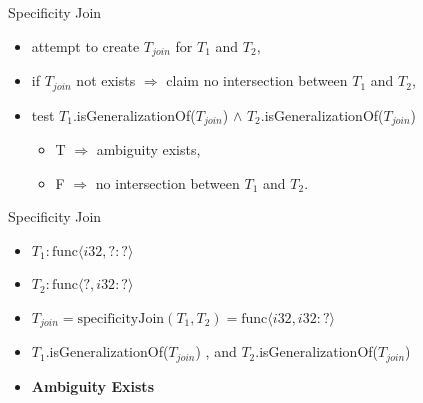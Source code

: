 \documentclass{beamer}
\newcommand{\cmark}{\ding{51}}%
\begin{document}
\begin{frame}{Specificity Join}
\begin{itemize}
    \item attempt to create $T_{join}$ for $T_1$ and $T_2$,
    \item if $T_{join}$ not exists $\Rightarrow$ claim no intersection
          between $T_1$ and $T_2$,
    \item test $T_1$.isGeneralizationOf($T_{join}$) $\land$ 
               $T_2$.isGeneralizationOf($T_{join}$) 
          \begin{itemize}
          \item T $\Rightarrow$ ambiguity exists,
          \item F $\Rightarrow$ no intersection between $T_1$ and $T_2$.
          \end{itemize}
\end{itemize}
\end{frame}

\begin{frame}{Specificity Join}
\begin{itemize}
    \item $T_1 : \text{func}\langle i32, ? : ? \rangle$
    \item $T_2 : \text{func}\langle ?, i32 : ? \rangle$
    \item $T_{join} = \text{specificityJoin}(T_1, T_2)
                    = \text{func}\langle i32, i32 : ? \rangle$
    \item $T_1$.isGeneralizationOf($T_{join}$) \cmark, and 
          $T_2$.isGeneralizationOf($T_{join}$) \cmark
    \item \textbf{Ambiguity Exists} 
\end{itemize}
\end{frame}
\end{document}
